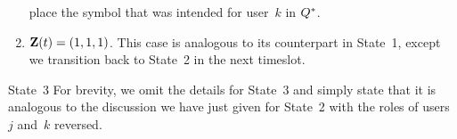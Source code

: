 \begin{LaTeXdescription}
\begin{enumerate}
place the symbol that was intended for user~$k$ in $Q^{*}$.
		\item $\mathbf{Z}(t) = (1, 1, 1)$.  This case is analogous to its counterpart in State~1, except we transition back to State~2 in the next timeslot.
	\end{enumerate}
\end{LaTeXdescription}


\begin{LaTeXdescription}
	\item [State~3]  For brevity, we omit the details for State~3 and simply state that it is analogous to the discussion we have just given for State~2 with the roles of users~$j$ and~$k$ reversed.
\end{LaTeXdescription}